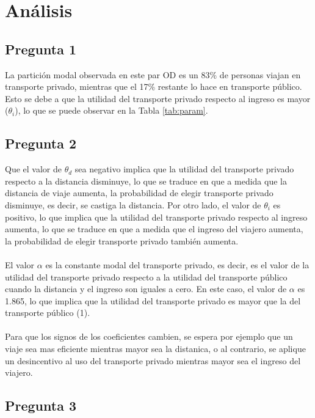 \section{Análisis}

\subsection{Pregunta 1}

La partición modal observada en este par OD es un 83\% de personas viajan en transporte privado, mientras que el 17\% restante lo hace en transporte público. Esto se debe a que la utilidad del transporte privado respecto al ingreso es mayor ($\theta_{i}$), lo que se puede observar en la Tabla \ref{tab:param}.

\subsection{Pregunta 2}

Que el valor de $\theta_{d}$ sea negativo implica que la utilidad del transporte privado respecto a la distancia disminuye, lo que se traduce en que a medida que la distancia de viaje aumenta, la probabilidad de elegir transporte privado disminuye, es decir, se castiga la distancia.
Por otro lado, el valor de $\theta_{i}$ es positivo, lo que implica que la utilidad del transporte privado respecto al ingreso aumenta, lo que se traduce en que a medida que el ingreso del viajero aumenta, la probabilidad de elegir transporte privado también aumenta.
\\ \\
El valor $\alpha$ es la constante modal del transporte privado, es decir, es el valor de la utilidad del transporte privado respecto a la utilidad del transporte público cuando la distancia y el ingreso son iguales a cero. En este caso, el valor de $\alpha$ es 1.865, lo que implica que la utilidad del transporte privado es mayor que la del transporte público (1).
\\ \\
Para que los signos de los coeficientes cambien, se espera por ejemplo que un viaje sea mas eficiente mientras mayor sea la distanica, o al contrario, se aplique un desincentivo al uso del transporte privado mientras mayor sea el ingreso del viajero.

\subsection{Pregunta 3}




